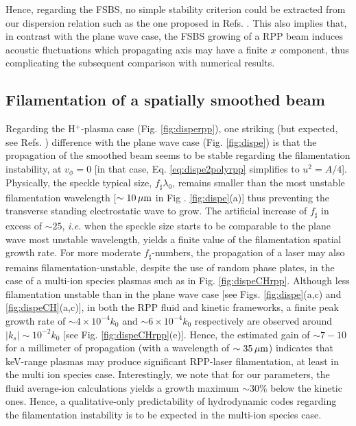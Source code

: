 \documentclass[
 reprint,
 amsmath,amssymb,
 aps,
]{revtex4-1}
\begin{document}
Hence, regarding the FSBS, no simple stability criterion could be extracted from our dispersion relation such as the one proposed in Refs. \cite[]{Lushnikov_2006,phd-Grech,PRL_Grech_2009}.
This also implies that, in contrast with the plane wave case, the FSBS growing of a RPP beam induces acoustic fluctuations which propagating axis may  have a finite $x$ component, thus   complicating  the subsequent comparison with numerical results.

\subsection{Filamentation of a spatially smoothed beam}\label{sec:filam}
Regarding the H$^+$-plasma case (Fig. \ref{fig:disperpp}), one striking (but expected, see Refs. \cite[]{NatPhys_Glenzer,PRL_Sarri_2011}) difference with the plane wave case  (Fig. \ref{fig:dispe}) is that the propagation of the smoothed beam seems to be stable regarding the filamentation instability, at $v_\phi=0$ [in that case, Eq. \eqref{eq:dispe2polyrpp} simplifies to $u^2=A/4$].
Physically, the speckle typical size, $f_\sharp\lambda_0$, remains smaller than the most unstable filamentation wavelength [$\sim 10 \,\rm\mu m$ in Fig . \ref{fig:dispe}(a)] thus preventing the transverse standing electrostatic wave to grow. The artificial increase of $f_\sharp$ in excess of $\sim 25$, \emph{i.e.} when the speckle size starts to be comparable to the plane wave most unstable wavelength,  yields a finite value of the filamentation spatial growth rate. 
For more moderate  $f_\sharp$-numbers, the propagation of a laser may  also remains filamentation-unstable, despite the use of random phase plates,  in  the case of a multi-ion species plasmas such as in Fig.   \ref{fig:dispeCHrpp}. Although less filamentation unstable than in the plane wave case [see Figs. \ref{fig:dispe}(a,c) and \ref{fig:dispeCH}(a,c)], in both the RPP fluid and kinetic frameworks, a finite peak growth rate of $\sim 4\times 10^{-4}k_0 $ and $\sim 6\times 10^{-4}k_0 $ respectively  are observed around $\vert k_s\vert \sim  10^{-2}k_0$ [see Fig. \ref{fig:dispeCHrpp}(e)].
Hence, the estimated  gain of $\sim 7-10$   for a millimeter of propagation (with a wavelength of $\sim 35 \,\rm \mu m$) indicates that keV-range plasmas may produce significant RPP-laser filamentation, at least in the multi ion species case.
Interestingly, we note that  for our parameters, the fluid average-ion calculations yields a growth maximum   $\sim 30\%$ below the kinetic ones. Hence, a qualitative-only  predictability of hydrodynamic codes regarding the filamentation instability is to be expected in the multi-ion species case.
\end{document}

